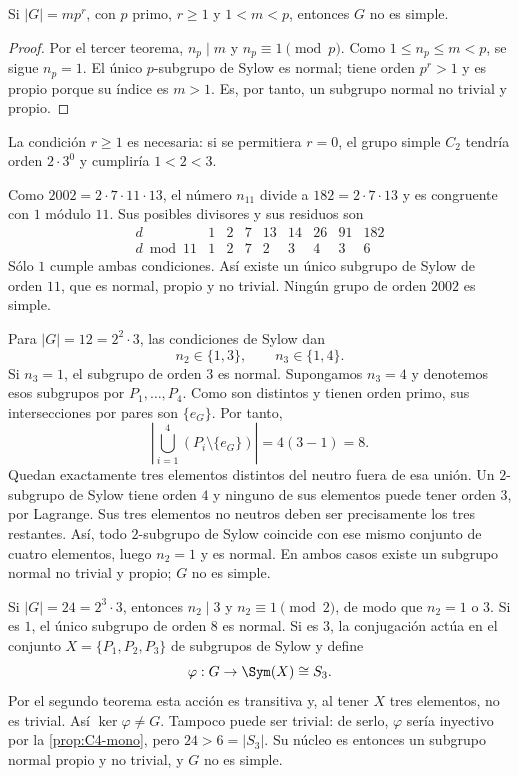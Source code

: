 \begin{prop}\label{prop:C7-no-simple}
Si $|G|=mp^r$, con $p$ primo, $r\ge1$ y $1<m<p$, entonces $G$ no es simple.
\end{prop}
\begin{proof}
Por el tercer teorema, $n_p\mid m$ y $n_p\equiv1\pmod p$. Como $1\le n_p\le m<p$, se sigue $n_p=1$. El único $p$-subgrupo de Sylow es normal; tiene orden $p^r>1$ y es propio porque su índice es $m>1$. Es, por tanto, un subgrupo normal no trivial y propio.
\end{proof}
\begin{obs}
La condición $r\ge1$ es necesaria: si se permitiera $r=0$, el grupo simple $C_2$ tendría orden $2\cdot3^0$ y cumpliría $1<2<3$.
\end{obs}

\begin{ejem}[Orden $2002$]
Como $2002=2\cdot7\cdot11\cdot13$, el número $n_{11}$ divide a $182=2\cdot7\cdot13$ y es congruente con $1$ módulo $11$. Sus posibles divisores y sus residuos son
\[
\begin{array}{c|rrrrrrrr}
d&1&2&7&13&14&26&91&182\\\hline
d\bmod11&1&2&7&2&3&4&3&6
\end{array}
\]
Sólo $1$ cumple ambas condiciones. Así existe un único subgrupo de Sylow de orden $11$, que es normal, propio y no trivial. Ningún grupo de orden $2002$ es simple.
\end{ejem}

\begin{ejem}[Orden $12$]
Para $|G|=12=2^2\cdot3$, las condiciones de Sylow dan
\[
n_2\in\{1,3\},\qquad n_3\in\{1,4\}.
\]
Si $n_3=1$, el subgrupo de orden $3$ es normal. Supongamos $n_3=4$ y denotemos esos subgrupos por $P_1,\ldots,P_4$. Como son distintos y tienen orden primo, sus intersecciones por pares son $\{e_G\}$. Por tanto,
\[
\left|\bigcup_{i=1}^4(P_i\setminus\{e_G\})\right|=4(3-1)=8.
\]
Quedan exactamente tres elementos distintos del neutro fuera de esa unión. Un $2$-subgrupo de Sylow tiene orden $4$ y ninguno de sus elementos puede tener orden $3$, por Lagrange. Sus tres elementos no neutros deben ser precisamente los tres restantes. Así, todo $2$-subgrupo de Sylow coincide con ese mismo conjunto de cuatro elementos, luego $n_2=1$ y es normal. En ambos casos existe un subgrupo normal no trivial y propio; $G$ no es simple.
\end{ejem}

\begin{ejem}[Orden $24$]
Si $|G|=24=2^3\cdot3$, entonces $n_2\mid3$ y $n_2\equiv1\pmod2$, de modo que $n_2=1$ o $3$. Si es $1$, el único subgrupo de orden $8$ es normal. Si es $3$, la conjugación actúa en el conjunto $X=\{P_1,P_2,P_3\}$ de subgrupos de Sylow y define
\[
\varphi:G\to\Sym(X)\cong S_3.
\]
Por el segundo teorema esta acción es transitiva y, al tener $X$ tres elementos, no es trivial. Así $\ker\varphi\ne G$. Tampoco puede ser trivial: de serlo, $\varphi$ sería inyectivo por la \cref{prop:C4-mono}, pero $24>6=|S_3|$. Su núcleo es entonces un subgrupo normal propio y no trivial, y $G$ no es simple.
\end{ejem}

